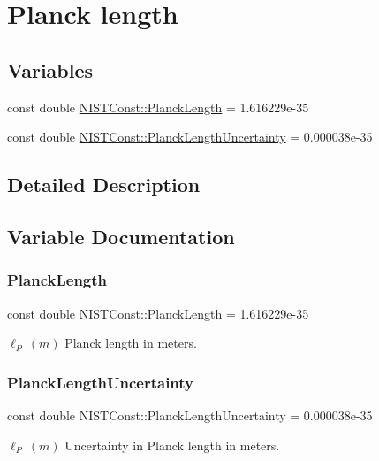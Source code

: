 \hypertarget{group___n_i_s_t_const-_planck_length}{}\section{Planck length}
\label{group___n_i_s_t_const-_planck_length}
\subsection*{Variables}
\begin{DoxyCompactItemize}
\item 
const double \hyperlink{group___n_i_s_t_const-_planck_length_ga1bc5c33e67f9810e7505b30076df5ca3}{N\+I\+S\+T\+Const\+::\+Planck\+Length} = 1.\+616229e-\/35
\item 
const double \hyperlink{group___n_i_s_t_const-_planck_length_ga2d3d3a738fb656be716e3acf32fdc7d5}{N\+I\+S\+T\+Const\+::\+Planck\+Length\+Uncertainty} = 0.\+000038e-\/35
\end{DoxyCompactItemize}


\subsection{Detailed Description}


\subsection{Variable Documentation}
\mbox{\label{group___n_i_s_t_const-_planck_length_ga1bc5c33e67f9810e7505b30076df5ca3}} 
\subsubsection{\texorpdfstring{Planck\+Length}{PlanckLength}}
{\footnotesize\ttfamily const double N\+I\+S\+T\+Const\+::\+Planck\+Length = 1.\+616229e-\/35}

$\ell_P \ (m)$ Planck length in meters. \mbox{\label{group___n_i_s_t_const-_planck_length_ga2d3d3a738fb656be716e3acf32fdc7d5}} 
\subsubsection{\texorpdfstring{Planck\+Length\+Uncertainty}{PlanckLengthUncertainty}}
{\footnotesize\ttfamily const double N\+I\+S\+T\+Const\+::\+Planck\+Length\+Uncertainty = 0.\+000038e-\/35}

$\ell_P \ (m)$ Uncertainty in Planck length in meters. 